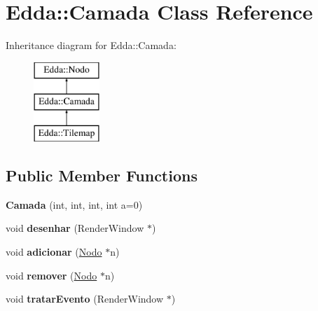 \hypertarget{class_edda_1_1_camada}{
\section{Edda::Camada Class Reference}
\label{class_edda_1_1_camada}
}
Inheritance diagram for Edda::Camada:\begin{figure}[H]
\begin{center}
\leavevmode
\includegraphics[height=3.000000cm]{class_edda_1_1_camada}
\end{center}
\end{figure}
\subsection*{Public Member Functions}
\begin{DoxyCompactItemize}
\item 
\hypertarget{class_edda_1_1_camada_a9ca2592c914f8a071604a20f7088818b}{
{\bfseries Camada} (int, int, int, int a=0)}
\label{class_edda_1_1_camada_a9ca2592c914f8a071604a20f7088818b}

\item 
\hypertarget{class_edda_1_1_camada_afac6eae74e2af943636e3ff93c2fb2d7}{
void {\bfseries desenhar} (RenderWindow $\ast$)}
\label{class_edda_1_1_camada_afac6eae74e2af943636e3ff93c2fb2d7}

\item 
\hypertarget{class_edda_1_1_camada_a33c1914ece04b8fc16c1762c932e99c4}{
void {\bfseries adicionar} (\hyperlink{class_edda_1_1_nodo}{Nodo} $\ast$n)}
\label{class_edda_1_1_camada_a33c1914ece04b8fc16c1762c932e99c4}

\item 
\hypertarget{class_edda_1_1_camada_a6ba56fdf8a66e08ef7e20aaaf43e4fba}{
void {\bfseries remover} (\hyperlink{class_edda_1_1_nodo}{Nodo} $\ast$n)}
\label{class_edda_1_1_camada_a6ba56fdf8a66e08ef7e20aaaf43e4fba}

\item 
\hypertarget{class_edda_1_1_camada_a79606763972bb5760d8d3e7537652220}{
void {\bfseries tratarEvento} (RenderWindow $\ast$)}
\label{class_edda_1_1_camada_a79606763972bb5760d8d3e7537652220}

\end{DoxyCompactItemize}
